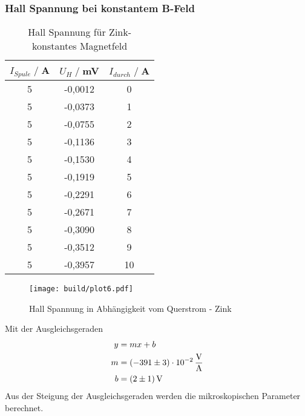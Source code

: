 \subsubsection{Hall Spannung bei konstantem B-Feld}
\begin{table}[H]
    \centering
    \begin{tabular}{c c c}
        \toprule
        $I_{Spule} \;/\;$A & $U_H\;/\;$mV & $I_{durch} \;/\;$A\\
        \midrule
            5                   &-0,0012&             0\\
            5                   &-0,0373&             1\\
            5                   &-0,0755&             2\\
            5                   &-0,1136&             3\\
            5                   &-0,1530&             4\\
            5                   &-0,1919&             5\\
            5                   &-0,2291&             6\\
            5                   &-0,2671&             7\\
            5                   &-0,3090&             8\\
            5                   &-0,3512&             9\\
            5                   &-0,3957&             10\\
        \bottomrule
    \end{tabular}
    \caption{Hall Spannung für Zink- konstantes Magnetfeld}
    \label{tab:Zn_B}
\end{table}
\begin{figure}[H]
    \centering
    \texttt{[image: build/plot6.pdf]}
    \caption{Hall Spannung in Abhängigkeit vom Querstrom - Zink}
    \label{fig:Zn_B}
\end{figure}
Mit der Ausgleichsgeraden
\begin{align*}
    y &= mx + b\\
    m &= \SI{-391 \pm 3 e-02}{\volt \per \ampere}\\
    b &= \SI{2 \pm 1}{\volt}\\
\end{align*}
Aus der Steigung der Ausgleichsgeraden werden die mikroskopischen Parameter berechnet.
